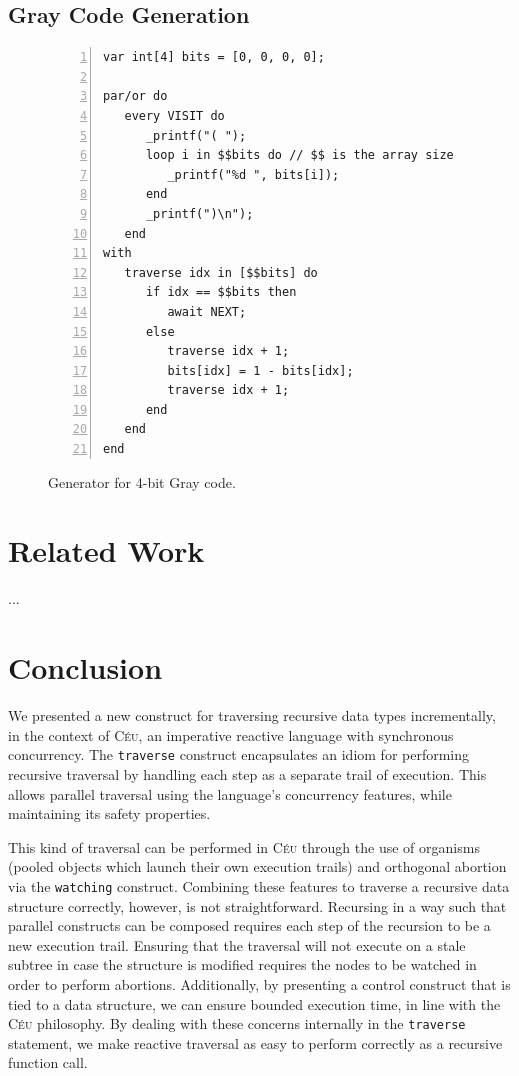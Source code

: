 \documentclass{acm_proc_article-sp}
\newcommand{\CEU}{\textsc{C\'{e}u}\xspace}
\newcommand{\code}[1] {{\small{\texttt{#1}}}}
\begin{document}
\subsection{Gray Code Generation}

\begin{figure}%
\begin{lstlisting}[numbers=left,xleftmargin=3em]
var int[4] bits = [0, 0, 0, 0];

par/or do
   every VISIT do
      _printf("( ");
      loop i in $$bits do // $$ is the array size
         _printf("%d ", bits[i]);
      end
      _printf(")\n");
   end
with
   traverse idx in [$$bits] do
      if idx == $$bits then
         await NEXT;
      else
         traverse idx + 1;
         bits[idx] = 1 - bits[idx];
         traverse idx + 1;
      end
   end
end
\end{lstlisting}
\caption{ Generator for 4-bit Gray code.
\label{lst.gray}
}
\end{figure}



\section{Related Work}

...

\section{Conclusion}

We presented a new construct for traversing recursive data types
incrementally, in the context of \CEU, an imperative reactive language with
synchronous concurrency. The \code{traverse} construct encapsulates an idiom
for performing recursive traversal by handling each step as a separate trail
of execution. This allows parallel traversal using the language's concurrency
features, while maintaining its safety properties.

This kind of traversal can be performed in \CEU through the use of organisms
(pooled objects which launch their own execution trails) and orthogonal
abortion via the \code{watching} construct. Combining these features to
traverse a recursive data structure correctly, however, is not straightforward.
Recursing in a way such that parallel constructs can be composed requires each
step of the recursion to be a new execution trail. Ensuring that the traversal
will not execute on a stale subtree in case the structure is modified requires
the nodes to be watched in order to perform abortions. Additionally, by
presenting a control construct that is tied to a data structure, we can ensure
bounded execution time, in line with the \CEU philosophy. By dealing with these
concerns internally in the \code{traverse} statement, we make reactive
traversal as easy to perform correctly as a recursive function call.
\end{document}
